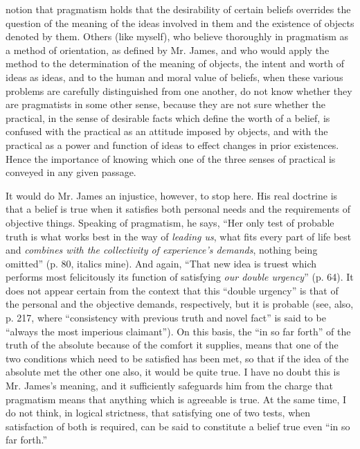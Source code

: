 \documentclass[12pt]{article}
\begin{document}
notion that pragmatism holds that the desirability of certain beliefs
overrides the question of the meaning of the ideas involved in them
and the existence of objects denoted by them. Others (like myself),
who believe thoroughly in pragmatism as a method of orientation, as
defined by Mr. James, and who would apply the method to the
determination of the meaning of objects, the intent and worth of ideas
as ideas, and to the human and moral value of beliefs, when these
various problems are carefully distinguished from one another, do not
know whether they are pragmatists in some other sense, because they
are not sure whether the practical, in the sense of desirable facts
which define the worth of a belief, is confused with the practical as
an attitude imposed by objects, and with the practical as a power and
function of ideas to effect changes in prior existences. Hence the
importance of knowing which one of the three senses of practical is
conveyed in any given passage.


It would do Mr. James an injustice, however, to stop here. His real
doctrine is that a belief is true when it satisfies both personal
needs and the requirements of objective things. Speaking of
pragmatism, he says, ``Her only test of probable truth is what works
best in the way of \emph{leading us}, what fits every part of life best and
\emph{combines with the collectivity of experience's demands}, nothing
being omitted'' (p. 80, italics mine). And again, ``That new idea is
truest which performs most felicitously its function of satisfying
\emph{our double urgency}'' (p. 64). It does not appear certain from the
context that this ``double urgency'' is that of the personal and the
objective demands, respectively, but it is probable (see, also, p.
217, where ``consistency with previous truth and novel fact'' is said to
be ``always the most imperious claimant''). On this basis, the ``in so
far forth'' of the truth of the absolute because of the comfort it
supplies, means that one of the two conditions which need to be
satisfied has been met, so that if the idea of the absolute met the
other one also, it would be quite true. I have no doubt this is Mr.
James's meaning, and it sufficiently safeguards him from the charge
that pragmatism means that anything which is agreeable is true. At the
same time, I do not think, in logical strictness, that satisfying one
of two tests, when satisfaction of both is required, can be said to
constitute a belief true even ``in so far forth.''
\end{document}
